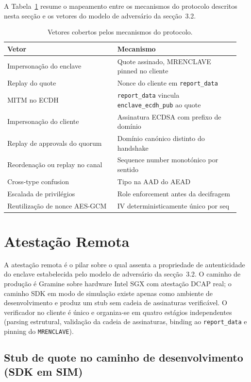 A Tabela~\ref{tab:protocol-mitigations} resume o mapeamento entre os mecanismos do protocolo descritos nesta secção e os vetores do modelo de adversário da secção~3.2.

\begin{table}[H]
\centering
\small
\begin{tabular}{p{0.45\linewidth}p{0.5\linewidth}}
\toprule
Vetor & Mecanismo \\
\midrule
Impersonação do enclave & Quote assinado, MRENCLAVE pinned no cliente \\
Replay do quote & Nonce do cliente em \texttt{report\_data} \\
MITM no ECDH & \texttt{report\_data} vincula \texttt{enclave\_ecdh\_pub} ao quote \\
Impersonação do cliente & Assinatura ECDSA com prefixo de domínio \\
Replay de approvals do quorum & Domínio canónico distinto do handshake \\
Reordenação ou replay no canal & Sequence number monotónico por sentido \\
Cross-type confusion & Tipo na AAD do AEAD \\
Escalada de privilégios & Role enforcement antes da decifragem \\
Reutilização de nonce AES-GCM & IV deterministicamente único por seq \\
\bottomrule
\end{tabular}
\caption{Vetores cobertos pelos mecanismos do protocolo.}
\label{tab:protocol-mitigations}
\end{table}

\section{Atestação Remota}

A atestação remota é o pilar sobre o qual assenta a propriedade de autenticidade do enclave estabelecida pelo modelo de adversário da secção~3.2. O caminho de produção é Gramine sobre hardware Intel SGX com atestação DCAP real; o caminho SDK em modo de simulação existe apenas como ambiente de desenvolvimento e produz um stub sem cadeia de assinaturas verificável. O verificador no cliente é único e organiza-se em quatro estágios independentes (parsing estrutural, validação da cadeia de assinaturas, binding ao \texttt{report\_data} e pinning do \texttt{MRENCLAVE}).

\subsection{Stub de quote no caminho de desenvolvimento (SDK em SIM)}

